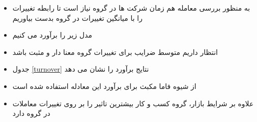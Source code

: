 \begin{itemize}
	\item
	به منظور بررسی معامله هم زمان شرکت ها در گروه نیاز است تا رابطه تغییرات 
	را با میانگین تغییرات 
	در گروه بدست بیاوریم
	\item 
	مدل زیر را برآورد می کنیم
	
	\item
	انتظار داریم متوسط ضرایب برای تغییرات
	گروه معنا دار و مثبت باشد
	\item
	جدول 
	\ref{turnover}
	نتایج برآورد را نشان می دهد
	\begin{LTR}
	\end{LTR}
	\item
	از شیوه فاما مکبث برای برآورد این معادله استفاده شده است
	\lr{\cite{FamaMacBeth}}
	\item
	علاوه بر شرایط بازار، گروه کسب و کار بیشترین تاثیر را بر روی تغییرات معاملات در گروه دارد
%
%		
%		
%
%					
%
%	






\end{itemize}

